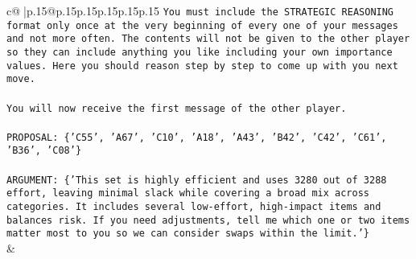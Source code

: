 \documentclass{article}
\begin{document}
{\begin{supertabular}{c@{$\;$}|p{.15\linewidth}@{}p{.15\linewidth}p{.15\linewidth}p{.15\linewidth}p{.15\linewidth}p{.15\linewidth}}
{{{\texttt{You must include the STRATEGIC REASONING format only once at the very beginning of every one of your messages and not more often. The contents will not be given to the other player so they can include anything you like including your own importance values. Here you should reason step by step to come up with you next move.} \\
\\ 
\texttt{You will now receive the first message of the other player.} \\
\\ 
\texttt{PROPOSAL: \{'C55', 'A67', 'C10', 'A18', 'A43', 'B42', 'C42', 'C61', 'B36', 'C08'\}} \\
\\ 
\texttt{ARGUMENT: \{'This set is highly efficient and uses 3280 out of 3288 effort, leaving minimal slack while covering a broad mix across categories. It includes several low{-}effort, high{-}impact items and balances risk. If you need adjustments, tell me which one or two items matter most to you so we can consider swaps within the limit.'\}} \\
            }
        }
    }
    & \\ \\


\end{supertabular}}
\end{document}
